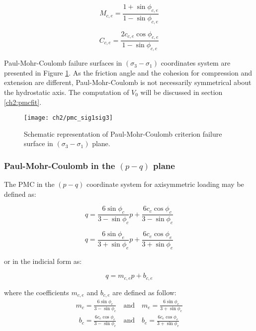 \begin{equation}\label{eq2:PMC_sig1sig3_Mce}
    M_{c,e} = \frac{1+\sin \phi_{c,e}}{1-\sin \phi_{c,e}}
\end{equation}

\begin{equation}\label{eq2:PMC_sig1sig3_Cce}
    C_{c,e} = \frac{2c_{c,e}\cos \phi_{c,e}}{1-\sin \phi_{c,e}}
\end{equation}

Paul-Mohr-Coulomb failure surfaces in $(\sigma_3 -\sigma_1)$ coordinates system are presented in Figure \ref{fig2:pmc_sig1sig3}. As the friction angle and the cohesion for compression and extension are different, Paul-Mohr-Coulomb is not necessarily symmetrical about the hydrostatic axis. The computation of $V_0$ will be discussed in section \ref{ch2:pmcfit}. 

\begin{figure}[tb]
    \centering
    \texttt{[image: ch2/pmc\_sig1sig3]}
    \caption{Schematic representation of Paul-Mohr-Coulomb criterion failure surface in $(\sigma_3 -\sigma_1)$ plane.}
    \label{fig2:pmc_sig1sig3}
\end{figure} 

\subsubsection{Paul-Mohr-Coulomb in the \texorpdfstring{$(p-q)$}{p-q} plane}

The PMC in the $(p-q)$ coordinate system for axisymmetric loading may be defined as:

\begin{equation}\label{eq2:pmc-q-CTC}
    q=\frac{6 \sin \phi_{c}}{3-\sin \phi_{c}} p+\frac{6 c_{c} \cos \phi_{c}}{3-\sin \phi_{c}}
\end{equation}

\begin{equation}\label{eq2:pmc-q-CTE}
    q=\frac{6 \sin \phi_{e}}{3+\sin \phi_{e}} p+\frac{6 c_{e} \cos  \phi_{e}}{3+\sin \phi_{e}}
\end{equation}

or in the indicial form as:

\begin{equation}\label{eq2:PMC_pq}
    q = m_{c,e}p+b_{c,e}
\end{equation}

where the coefficients $m_{c,e}$ and $b_{c,e}$ are defined as follow:
\begin{align}\label{eq2:pmc_m_pq}
    m_c=\frac{6 \sin \phi_{c}}{3-\sin \phi_{c}} \quad \textrm{and} \quad m_e=\frac{6 \sin \phi_{e}}{3+\sin \phi_{e}} 
\end{align}
\begin{align}\label{eq2:pmc_b_pq}
    b_c=\frac{6 c_{c} \cos \phi_{c}}{3-\sin \phi_{c}}\quad \textrm{and} \quad b_e=\frac{6 c_{e} \cos \phi_{e}}{3+\sin \phi_{e}}
\end{align}

